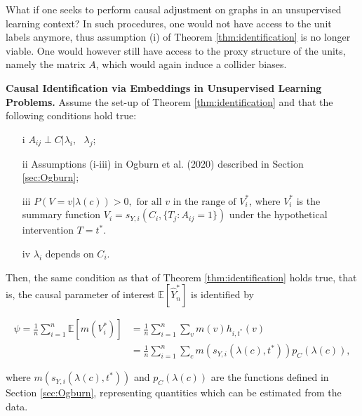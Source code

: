 \documentclass{article}
\begin{document}
What if one seeks to perform causal adjustment on graphs in an unsupervised learning context? In such procedures, one would not have access to the unit labels anymore, thus assumption (i) of Theorem \ref{thm:identification} is no longer viable. One would however still have access to the proxy structure of the units, namely the matrix $A$, which would again induce a collider biases. 


\begin{cor} \textbf{Causal Identification via Embeddings in Unsupervised Learning Problems.}
\label{cor:identification}
Assume the set-up of Theorem \ref{thm:identification} and that the following conditions hold true:


\begin{itemize}
\item[i]  $A_{ij} \perp C  | \lambda_i, \mbox{ } \lambda_j$;
\item[ii]  Assumptions (i-iii) in Ogburn et al. (2020) \cite{Ogburn2020} described in Section \ref{sec:Ogburn};
\item[iii] $P(V = v| \lambda(c)) > 0, \mbox{ for all } v \mbox{ in the range of } V_i^*$, where $V_i^*$ is the summary function $V_i = s_{Y, i}(C_i, \{T_j: A_{ij} =1\})$ under the hypothetical intervention $ T = t^*$. 
\item[iv] $\lambda_i$ depends on $C_i$.  
\end{itemize}

Then, the same condition as that of Theorem \ref{thm:identification} holds true, that is, the causal parameter of interest $\mathbb{E}[\hat{Y}_n^*]$ is identified by

\begin{align}
\label{eqn:identification}
\psi = \frac{1}{n} \sum_{i=1}^n \mathbb{E}[m(V_i^*)] &= \frac{1}{n} \sum_{i=1}^n \sum_v m(v) h_{i, t^*} (v) \\
&= \frac{1}{n} \sum_{i=1}^n \sum_{c} m(s_{Y, i} (\lambda(c), t^*)) p_C(\lambda(c)),
\end{align}


\noindent where $m(s_{Y, i} (\lambda(c), t^*))$ and $p_C(\lambda(c))$ are the functions defined in Section \ref{sec:Ogburn}, representing quantities which can be estimated from the data.
\end{cor}
\end{document}
